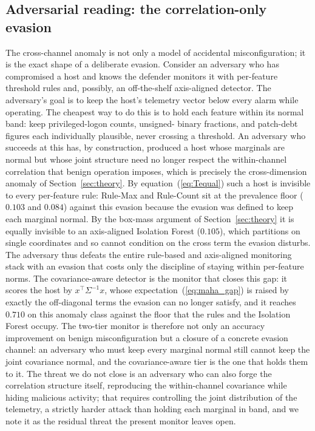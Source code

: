 \documentclass[journal]{IEEEtran}
\begin{document}
\subsection{Adversarial reading: the correlation-only evasion}
The cross-channel anomaly is not only a model of accidental misconfiguration; it is the exact shape of
a deliberate evasion. Consider an adversary who has compromised a host and knows the defender monitors
it with per-feature threshold rules and, possibly, an off-the-shelf axis-aligned detector. The
adversary's goal is to keep the host's telemetry vector below every alarm while operating. The cheapest
way to do this is to hold each feature within its normal band: keep privileged-logon counts, unsigned-
binary fractions, and patch-debt figures each individually plausible, never crossing a threshold. An
adversary who succeeds at this has, by construction, produced a host whose marginals are normal but
whose joint structure need no longer respect the within-channel correlation that benign operation
imposes, which is precisely the cross-dimension anomaly of Section~\ref{sec:theory}. By
equation~(\ref{eq:Tequal}) such a host is invisible to every per-feature rule: Rule-Max and Rule-Count
sit at the prevalence floor ($0.103$ and $0.084$) against this evasion because the evasion was defined
to keep each marginal normal. By the box-mass argument of Section~\ref{sec:theory} it is equally
invisible to an axis-aligned Isolation Forest ($0.105$), which partitions on single coordinates and so
cannot condition on the cross term the evasion disturbs. The adversary thus defeats the entire
rule-based and axis-aligned monitoring stack with an evasion that costs only the discipline of staying
within per-feature norms. The covariance-aware detector is the monitor that closes this gap: it scores
the host by $x^{\top}\Sigma^{-1} x$, whose expectation~(\ref{eq:maha_gap}) is raised by exactly the
off-diagonal terms the evasion can no longer satisfy, and it reaches $0.710$ on this anomaly class
against the floor that the rules and the Isolation Forest occupy. The two-tier monitor is therefore not
only an accuracy improvement on benign misconfiguration but a closure of a concrete evasion channel: an
adversary who must keep every marginal normal still cannot keep the joint covariance normal, and the
covariance-aware tier is the one that holds them to it. The threat we do not close is an adversary who
can also forge the correlation structure itself, reproducing the within-channel covariance while
hiding malicious activity; that requires controlling the joint distribution of the telemetry, a
strictly harder attack than holding each marginal in band, and we note it as the residual threat the
present monitor leaves open.
\end{document}
